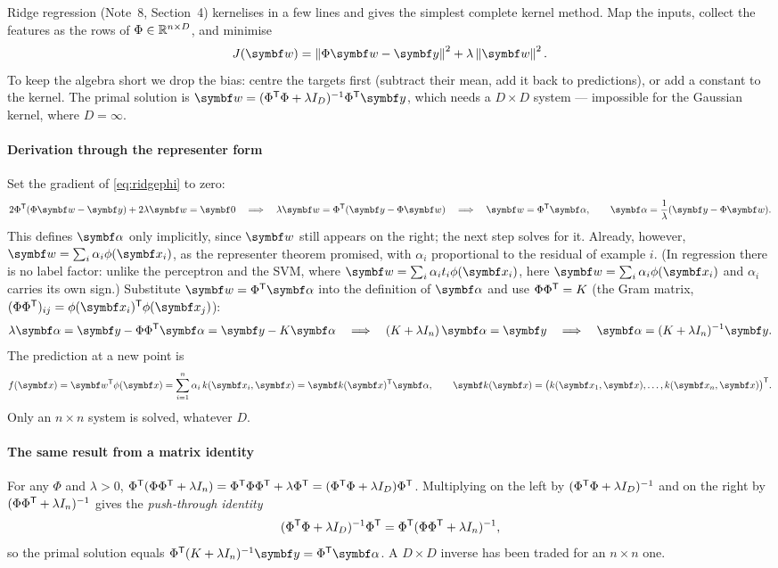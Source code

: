 \documentclass[11pt]{article}
\newcommand{\w}{\vect{w}}
\newcommand{\y}{\vect{y}}
\newcommand{\valpha}{\vect{\alpha}}
\newcommand{\kv}{\vect{k}}
\begin{document}
Ridge regression (Note~8, Section~4) kernelises in a few lines and gives the simplest complete kernel method. Map the
inputs, collect the features as the rows of $\Phi \in \mathbb{R}^{n \times D}$, and minimise
\begin{equation}\label{eq:ridgephi}
  J(\w) = \norm{\Phi\w - \y}^2 + \lambda\norm{\w}^2 .
\end{equation}
To keep the algebra short we drop the bias: centre the targets first (subtract their mean, add it back to predictions),
or add a constant to the kernel. The primal solution is $\w = (\Phi\T\Phi + \lambda I_D)^{-1}\Phi\T\y$, which needs a
$D \times D$ system --- impossible for the Gaussian kernel, where $D = \infty$.

\paragraph{Derivation through the representer form} Set the gradient of \eqref{eq:ridgephi} to zero:
\[
  2\Phi\T(\Phi\w - \y) + 2\lambda\w = \vect{0}
  \quad\Longrightarrow\quad
  \lambda\w = \Phi\T(\y - \Phi\w)
  \quad\Longrightarrow\quad
  \w = \Phi\T\valpha, \qquad \valpha = \frac{1}{\lambda}(\y - \Phi\w) .
\]
This defines $\valpha$ only implicitly, since $\w$ still appears on the right; the next step solves for it. Already,
however, $\w = \sum_i \alpha_i\phi(\x_i)$, as the representer theorem promised, with $\alpha_i$ proportional to the
residual of example $i$. (In regression there is no label factor: unlike the perceptron and the SVM, where
$\w = \sum_i \alpha_it_i\phi(\x_i)$, here $\w = \sum_i \alpha_i\phi(\x_i)$ and $\alpha_i$ carries its own sign.) Substitute $\w = \Phi\T\valpha$ into the definition of $\valpha$ and use $\Phi\Phi^{\mathsf{T}} = K$ (the Gram
matrix, $(\Phi\Phi\T)_{ij} = \phi(\x_i)\T\phi(\x_j)$):
\[
  \lambda\valpha = \y - \Phi\Phi\T\valpha = \y - K\valpha
  \quad\Longrightarrow\quad
  (K + \lambda I_n)\,\valpha = \y
  \quad\Longrightarrow\quad
  \valpha = (K + \lambda I_n)^{-1}\y .
\]
The prediction at a new point is
\begin{equation}\label{eq:krrpred}
  f(\x) = \w\T\phi(\x) = \sum_{i=1}^n \alpha_i\, k(\x_i, \x) = \kv(\x)\T\valpha, \qquad
  \kv(\x) = \big(k(\x_1, \x), \dots, k(\x_n, \x)\big)\T .
\end{equation}
Only an $n \times n$ system is solved, whatever $D$.

\paragraph{The same result from a matrix identity} For any $\Phi$ and $\lambda > 0$,
$\Phi^{\mathsf{T}}(\Phi\Phi^{\mathsf{T}} + \lambda I_n) = \Phi^{\mathsf{T}}\Phi\Phi^{\mathsf{T}} + \lambda\Phi^{\mathsf{T}} = (\Phi^{\mathsf{T}}\Phi + \lambda I_D)\Phi^{\mathsf{T}}$. Multiplying on
the left by $(\Phi^{\mathsf{T}}\Phi + \lambda I_D)^{-1}$ and on the right by $(\Phi\Phi^{\mathsf{T}} + \lambda I_n)^{-1}$ gives the
\emph{push-through identity}
\[
  (\Phi^{\mathsf{T}}\Phi + \lambda I_D)^{-1}\Phi^{\mathsf{T}} = \Phi^{\mathsf{T}}(\Phi\Phi^{\mathsf{T}} + \lambda I_n)^{-1} ,
\]
so the primal solution equals $\Phi\T(K + \lambda I_n)^{-1}\y = \Phi\T\valpha$. A $D \times D$ inverse has been traded for an
$n \times n$ one.
\end{document}
